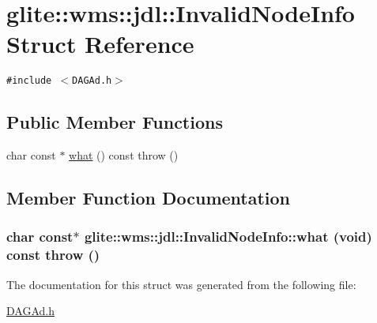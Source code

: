 \hypertarget{structglite_1_1wms_1_1jdl_1_1InvalidNodeInfo}{
\section{glite::wms::jdl::Invalid\-Node\-Info Struct Reference}
\label{structglite_1_1wms_1_1jdl_1_1InvalidNodeInfo}
}
{\tt \#include $<$DAGAd.h$>$}

\subsection*{Public Member Functions}
\begin{CompactItemize}
\item 
char const $\ast$ \hyperlink{structglite_1_1wms_1_1jdl_1_1InvalidNodeInfo_a0}{what} () const   throw ()
\end{CompactItemize}


\subsection{Member Function Documentation}
\hypertarget{structglite_1_1wms_1_1jdl_1_1InvalidNodeInfo_a0}{
\subsubsection[what]{\setlength{\rightskip}{0pt plus 5cm}char const$\ast$ glite::wms::jdl::Invalid\-Node\-Info::what (void) const  throw ()}}
\label{structglite_1_1wms_1_1jdl_1_1InvalidNodeInfo_a0}




The documentation for this struct was generated from the following file:\begin{CompactItemize}
\item 
\hyperlink{DAGAd_8h}{DAGAd.h}\end{CompactItemize}
